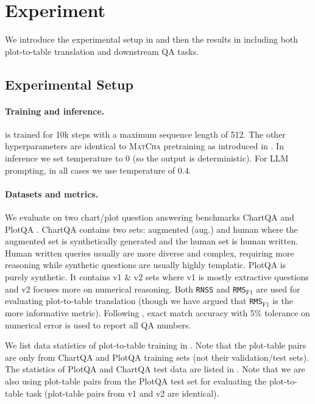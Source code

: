 \section{Experiment}\label{sec:exp}



We introduce the experimental setup in  and then the results in  including both plot-to-table translation and downstream QA tasks.


\subsection{Experimental Setup}\label{sec:setup}

\paragraph{Training and inference.} \model{} is trained for 10k steps with a maximum sequence length of 512. The other hyperparameters are identical to \textsc{MatCha} pretraining as introduced in \citet{liu2022matcha}. In \model{} inference we set temperature to $0$ (so the output is deterministic). For LLM prompting, in all cases we use temperature of $0.4$.


\paragraph{Datasets and metrics.} We evaluate on two chart/plot question answering benchmarks ChartQA \citep{masry-etal-2022-chartqa} and PlotQA \citep{methani2020plotqa}. ChartQA contains two sets: augmented (aug.) and human where the augmented set is synthetically generated and the human set is human written. Human written queries usually are more diverse and complex, requiring more reasoning while synthetic questions are usually highly templatic. PlotQA is purely synthetic. It contains v1 \& v2 sets where v1 is mostly extractive questions and v2 focuses more on numerical reasoning.  
Both \texttt{RNSS} and \texttt{RMS}$_{\text{F1}}$ are used for evaluating plot-to-table translation (though we have argued that \texttt{RMS}$_{\text{F1}}$ is the more informative metric). Following \citet{masry-etal-2022-chartqa,methani2020plotqa}, exact match accuracy with 5\% tolerance on numerical error is used to report all QA numbers.


We list data statistics of plot-to-table training in .  Note that the plot-table pairs are only from ChartQA and PlotQA training sets (not their validation/test sets). The statistics of PlotQA and ChartQA test data are listed in . Note that we are also using plot-table pairs from the PlotQA test set for evaluating the plot-to-table task (plot-table pairs from v1 and v2 are identical).

